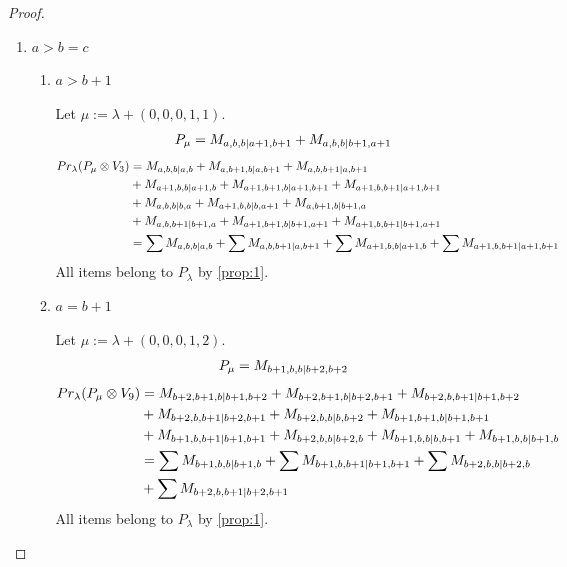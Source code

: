\begin{proof}
\begin{enumerate}
    \item $a>b=c$
      \begin{enumerate}
        \item $a>b+1$ \par
        Let $\mu:=\lambda + (0,0,0,1,1) $.
        \begin{equation}\notag
          \begin{aligned}
            P_\mu = M_{a,b,b|a+1,b+1}
+ M_{a,b,b|b+1,a+1}
          \end{aligned}
        \end{equation}
        \begin{equation}\notag
          \begin{aligned}
            Pr_{\lambda}(P_\mu \otimes V_{3}) &=
M_{a,b,b|a,b}
+ M_{a,b+1,b|a,b+1}
+ M_{a,b,b+1|a,b+1}\\
                                              &
+ M_{a+1,b,b|a+1,b}
+ M_{a+1,b+1,b|a+1,b+1}
+ M_{a+1,b,b+1|a+1,b+1}\\
                                              &
+ M_{a,b,b|b,a}
+ M_{a+1,b,b|b,a+1}
+ M_{a,b+1,b|b+1,a}\\
                                              &
+ M_{a,b,b+1|b+1,a}
+ M_{a+1,b+1,b|b+1,a+1}
+ M_{a+1,b,b+1|b+1,a+1} \\
                                               &=
\sum M_{a,b,b|a,b}
+ \sum M_{a,b,b+1|a,b+1}
+ \sum M_{a+1,b,b|a+1,b}
+ \sum M_{a+1,b,b+1|a+1,b+1}
          \end{aligned}
        \end{equation}
All items belong to $P_\lambda$ by \cref{prop:1}.

        \item $a=b+1$ \par
        Let $\mu:=\lambda + (0,0,0,1,2) $.
        \begin{equation}\notag
          \begin{aligned}
            P_\mu = M_{b+1,b,b|b+2,b+2}
          \end{aligned}
        \end{equation}
        \begin{equation}\notag
          \begin{aligned}
            Pr_{\lambda}(P_\mu \otimes V_{9}) &=
M_{b+2,b+1,b|b+1,b+2}
+ M_{b+2,b+1,b|b+2,b+1}
+ M_{b+2,b,b+1|b+1,b+2}\\
                                              &
+ M_{b+2,b,b+1|b+2,b+1}
+ M_{b+2,b,b|b,b+2}
+ M_{b+1,b+1,b|b+1,b+1}\\
                                              &
+ M_{b+1,b,b+1|b+1,b+1}
+ M_{b+2,b,b|b+2,b}
+ M_{b+1,b,b|b,b+1}
+ M_{b+1,b,b|b+1,b} \\
                                               &=
\sum M_{b+1,b,b|b+1,b}
+ \sum M_{b+1,b,b+1|b+1,b+1}
+ \sum M_{b+2,b,b|b+2,b}\\
                                              &
+ \sum M_{b+2,b,b+1|b+2,b+1}
          \end{aligned}
        \end{equation}
All items belong to $P_\lambda$ by \cref{prop:1}.
      \end{enumerate}


\end{enumerate}
\end{proof}
